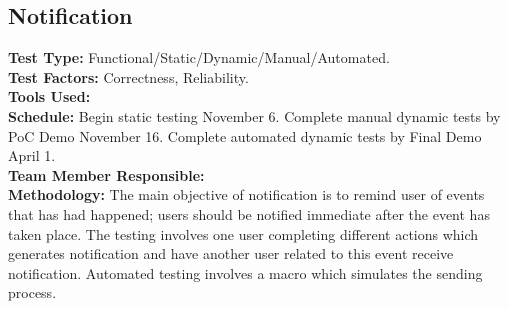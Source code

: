 \documentclass[12pt]{article}
\begin{document}
\subsection{Notification}
\textbf{Test Type:} Functional/Static/Dynamic/Manual/Automated. \\
\textbf{Test Factors:} Correctness, Reliability. \\
\textbf{Tools Used:} \\
\textbf{Schedule:} Begin static testing November 6. Complete manual dynamic tests by PoC Demo November 16. Complete automated dynamic tests by Final Demo April 1. \\
\textbf{Team Member Responsible:} \\
\textbf{Methodology:} The main objective of notification is to remind user of events that has had happened; users should be notified immediate after the event has taken place. The testing involves one user completing different actions which generates notification and have another user related to this event receive notification. Automated testing involves a macro which simulates the sending process.
\end{document}

